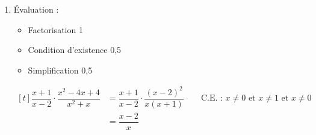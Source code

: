 %
%
    \begin{enumerate}
        \item
              Évaluation :
              \begin{itemize}
                  \item Factorisation \hfill 1
                  \item Condition d'existence \hfill 0,5
                  \item Simplification \hfill 0,5
              \end{itemize}
              $\begin{aligned}[t]
                      \dfrac{x+1}{x-2}\cdot\dfrac{x^2-4x+4}{x^2 + x} & = \dfrac{x+1}{x-2}\cdot\dfrac{(x-2)^2}{x(x+1)} \qquad \text{C.E. : } x\ne 0 \text{ et } x\ne 1 \text{ et } x\ne 0 \\
                                                                     & =\dfrac{x-2}{x}
                  \end{aligned}$

    \end{enumerate}
